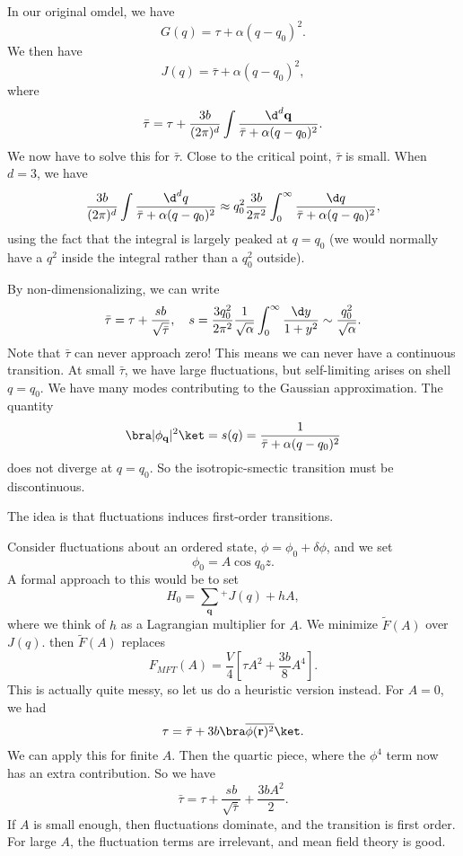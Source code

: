 \documentclass[a4paper]{article}
\begin{document}
In our original omdel, we have
\[
  G(q) = \tau + \alpha(q - q_0)^2.
\]
We then have
\[
  J(q) = \bar{\tau} + \alpha (q - q_0)^2,
\]
where
\[
  \bar{\tau} = \tau + \frac{3b}{(2\pi)^d} \int \frac{\d^d \mathbf{q}}{\bar{\tau} + \alpha(q - q_0)^2}.
\]
We now have to solve this for $\bar{\tau}$. Close to the critical point, $\bar{\tau}$ is small. When $d = 3$, we have
\[
  \frac{3b}{(2\pi)^d} \int \frac{\d^d q}{\bar{\tau} + \alpha (q - q_0)^2} \approx q_0^2 \frac{3b}{2\pi^2} \int_0^\infty \frac{\d q}{\bar{\tau} + \alpha (q - q_0)^2},
\]
using the fact that the integral is largely peaked at $q = q_0$ (we would normally have a $q^2$ inside the integral rather than a $q_0^2$ outside). %

By non-dimensionalizing, we can write
\[
  \bar{\tau} = \tau + \frac{sb}{\sqrt{\bar{\tau}}},\quad s = \frac{3q_0^2}{2\pi^2} \frac{1}{\sqrt{\alpha}} \int_0^\infty \frac{\d y}{1 + y^2} \sim \frac{q_0^2}{\sqrt{\alpha}}. %
\]
Note that $\bar{\tau}$ can never approach zero! This means we can never have a continuous transition. At small $\bar{\tau}$, we have large fluctuations, but self-limiting arises on shell $q = q_0$. We have many modes contributing to the Gaussian approximation. The quantity
\[
  \bra |\phi_\mathbf{q}|^2 \ket = s(q) = \frac{1}{\bar{\tau} + \alpha(q - q_0)^2}
\]
does not diverge at $q = q_0$. So the isotropic-smectic transition must be discontinuous.

The idea is that fluctuations induces first-order transitions.

Consider fluctuations about an ordered state, $\phi = \phi_0 + \delta \phi$, and we set
\[
  \phi_0 = A \cos q_0 z.
\]
A formal approach to this would be to set
\[
  H_0 = \sum_{\mathbf{q}} {}^+ J(q) + hA,
\]
where we think of $h$ as a Lagrangian multiplier for $A$. We minimize $\tilde{F}(A)$ over $J(q)$. then $\tilde{F}(A)$ replaces
\[
  F_{MFT}(A) = \frac{V}{4} \left[\tau A^2 + \frac{3b}{8} A^4\right].
\]
This is actually quite messy, so let us do a heuristic version instead. For $A = 0$, we had
\[
  \tau = \bar{\tau} + 3b \bra \overline{\phi(\mathbf{r})^2}\ket.
\]
We can apply this for finite $A$. Then the quartic piece, where the $\phi^4$ term now has an extra contribution. So we have
\[
  \bar{\tau} = \tau + \frac{sb}{\sqrt{\bar{\tau}}} + \frac{3b A^2}{2}.
\]
If $A$ is small enough, then fluctuations dominate, and the transition is first order. For large $A$, the fluctuation terms are irrelevant, and mean field theory is good.
\end{document}
